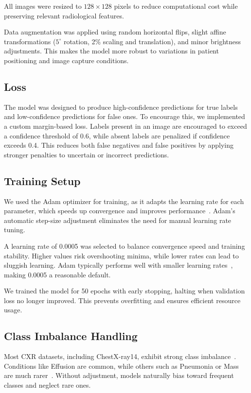 \documentclass[12pt]{article}
\begin{document}
\begin{multicols}{2}
All images were resized to $128\times128$ pixels to reduce computational cost while preserving relevant radiological features.

Data augmentation was applied using random horizontal flips, slight affine transformations ($5^{\circ}$ rotation, 2\% scaling and translation), and minor brightness adjustments. This makes the model more robust to variations in patient positioning and image capture conditions.

\subsection{Loss}

The model was designed to produce high-confidence predictions for true labels and low-confidence predictions for false ones. To encourage this, we implemented a custom margin-based loss. Labels present in an image are encouraged to exceed a confidence threshold of 0.6, while absent labels are penalized if confidence exceeds 0.4. This reduces both false negatives and false positives by applying stronger penalties to uncertain or incorrect predictions.

\subsection{Training Setup}

We used the Adam optimizer for training, as it adapts the learning rate for each parameter, which speeds up convergence and improves performance~\cite{adam}. Adam's automatic step-size adjustment eliminates the need for manual learning rate tuning.

A learning rate of 0.0005 was selected to balance convergence speed and training stability. Higher values risk overshooting minima, while lower rates can lead to sluggish learning. Adam typically performs well with smaller learning rates~\cite{adam}, making 0.0005 a reasonable default.

We trained the model for 50 epochs with early stopping, halting when validation loss no longer improved. This prevents overfitting and ensures efficient resource usage.

\subsection{Class Imbalance Handling}

Most CXR datasets, including ChestX-ray14, exhibit strong class imbalance~\cite{wang2017chestx}. Conditions like Effusion are common, while others such as Pneumonia or Mass are much rarer~\cite{mimic, adam}. Without adjustment, models naturally bias toward frequent classes and neglect rare ones.


\end{multicols}
\end{document}

